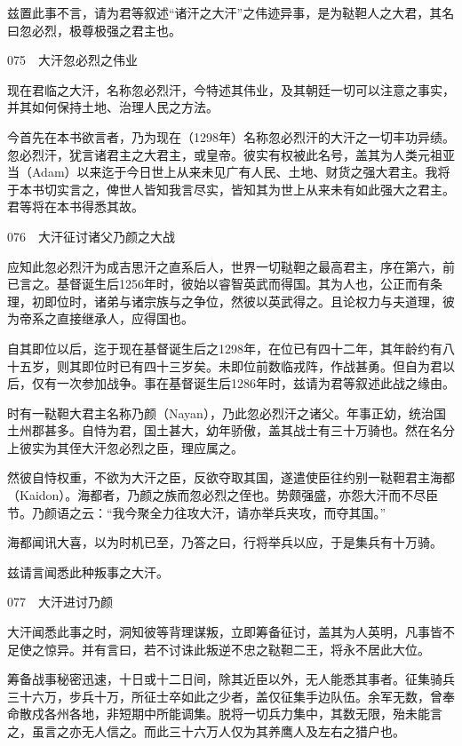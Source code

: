 \documentclass[12pt,UTF8]{ctexbook}
\begin{document}
兹置此事不言，请为君等叙述“诸汗之大汗”之伟迹异事，是为鞑靼人之大君，其名曰忽必烈，极尊极强之君主也。





075　大汗忽必烈之伟业

现在君临之大汗，名称忽必烈汗，今特述其伟业，及其朝廷一切可以注意之事实，并其如何保持土地、治理人民之方法。

今首先在本书欲言者，乃为现在（1298年）名称忽必烈汗的大汗之一切丰功异绩。忽必烈汗，犹言诸君主之大君主，或皇帝。彼实有权被此名号，盖其为人类元祖亚当（Adam）以来迄于今日世上从来未见广有人民、土地、财货之强大君主。我将于本书切实言之，俾世人皆知我言尽实，皆知其为世上从来未有如此强大之君主。君等将在本书得悉其故。





076　大汗征讨诸父乃颜之大战

应知此忽必烈汗为成吉思汗之直系后人，世界一切鞑靼之最高君主，序在第六，前已言之。基督诞生后1256年时，彼始以睿智英武而得国。其为人也，公正而有条理，初即位时，诸弟与诸宗族与之争位，然彼以英武得之。且论权力与夫道理，彼为帝系之直接继承人，应得国也。

自其即位以后，迄于现在基督诞生后之1298年，在位已有四十二年，其年龄约有八十五岁，则其即位时已有四十三岁矣。未即位前数临戎阵，作战甚勇。但自为君以后，仅有一次参加战争。事在基督诞生后1286年时，兹请为君等叙述此战之缘由。

时有一鞑靼大君主名称乃颜（Nayan），乃此忽必烈汗之诸父。年事正幼，统治国土州郡甚多。自恃为君，国土甚大，幼年骄傲，盖其战士有三十万骑也。然在名分上彼实为其侄大汗忽必烈之臣，理应属之。

然彼自恃权重，不欲为大汗之臣，反欲夺取其国，遂遣使臣往约别一鞑靼君主海都（Kaidon）。海都者，乃颜之族而忽必烈之侄也。势颇强盛，亦怨大汗而不尽臣节。乃颜语之云：“我今聚全力往攻大汗，请亦举兵夹攻，而夺其国。”

海都闻讯大喜，以为时机已至，乃答之曰，行将举兵以应，于是集兵有十万骑。

兹请言闻悉此种叛事之大汗。





077　大汗进讨乃颜

大汗闻悉此事之时，洞知彼等背理谋叛，立即筹备征讨，盖其为人英明，凡事皆不足使之惊异。并有言曰，若不讨诛此叛逆不忠之鞑靼二王，将永不居此大位。

筹备战事秘密迅速，十日或十二日间，除其近臣以外，无人能悉其事者。征集骑兵三十六万，步兵十万，所征士卒如此之少者，盖仅征集手边队伍。余军无数，曾奉命散戍各州各地，非短期中所能调集。脱将一切兵力集中，其数无限，殆未能言之，虽言之亦无人信之。而此三十六万人仅为其养鹰人及左右之猎户也。
\end{document}
